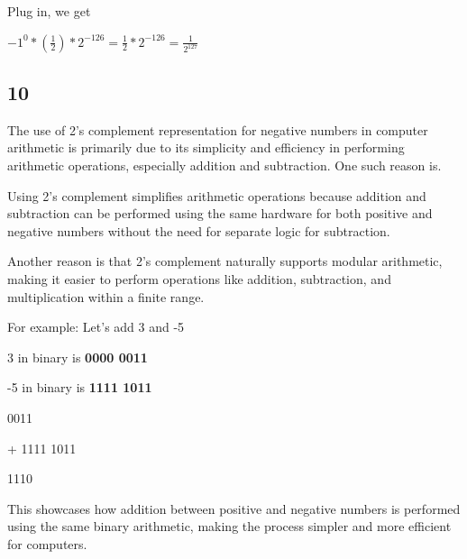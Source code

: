 \documentclass{article}
\begin{document}
    Plug in, we get

    $-1^0 * (\frac{1}{2}) * 2^{-126} = \frac{1}{2} * 2^{-126} = \frac{1}{2^{127}}$ \hspace*{0.3in} 

    \subsection*{10}

    The use of 2's complement representation for negative numbers in computer arithmetic is primarily due to its simplicity and efficiency in performing arithmetic operations, especially addition and subtraction. One such reason is.
    
    Using 2's complement simplifies arithmetic operations because addition and subtraction can be performed using the same hardware for both positive and negative numbers without the need for separate logic for subtraction.

    Another reason is that 2's complement naturally supports modular arithmetic, making it easier to perform operations like addition, subtraction, and multiplication within a finite range.

    \vspace*{0.2in}

    For example: Let's add 3 and -5

    3 in binary is \textbf{0000 0011}

    -5 in binary is \textbf{1111 1011}

    \:  0011

    + 1111 1011

     1110 

    This showcases how addition between positive and negative numbers is performed using the same binary arithmetic, making the process simpler and more efficient for computers.
    
\end{document}
